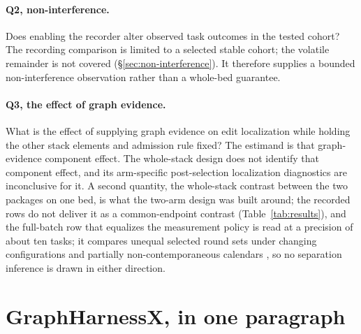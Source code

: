 \paragraph{Q2, non-interference.}\label{rq:2} Does enabling the recorder
alter observed task outcomes in the tested cohort? The recording comparison is
limited to a selected stable cohort; the volatile remainder is not covered
(\S\ref{sec:non-interference}). It therefore supplies a bounded
non-interference observation rather than a whole-bed guarantee.

\paragraph{Q3, the effect of graph evidence.}\label{rq:3} What is the
effect of supplying graph evidence on edit localization while holding the
other stack elements and admission rule fixed? The estimand is that
graph-evidence component effect. The whole-stack design
does not identify that component effect, and its arm-specific
post-selection localization diagnostics are inconclusive for it. A second
quantity, the whole-stack contrast between the two packages on one bed, is
what the two-arm design was built around; the recorded rows do not deliver
it as a common-endpoint contrast (Table~\ref{tab:results}), and the
full-batch row that equalizes the measurement policy is read at a precision
of about ten tasks; it compares unequal selected round sets under changing
configurations and partially non-contemporaneous calendars , so no
separation inference is drawn in either direction.

\section{GraphHarnessX, in one paragraph}
\label{sec:ghx-preview}

